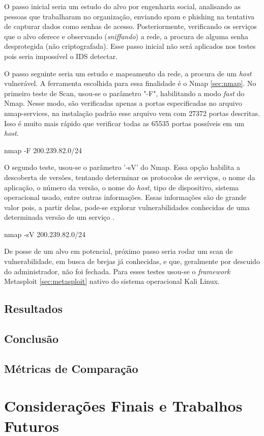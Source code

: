 \documentclass[
	12pt,				
	openright,		
	twoside,	
	a4paper,
	english,	
	brazil	
	]{abntex2}
\begin{document}
O passo inicial seria um estudo do alvo por engenharia social, analisando as pessoas que trabalharam no organização, enviando spam e phishing na tentativa de capturar dados como senhas de acesso. Posteriormente, verificando os serviços que o alvo oferece e observando (\textit{sniffando}) a rede, a procura de alguma senha desprotegida (não criptografada). Esse passo inicial não será aplicados nos testes pois seria impossível o IDS detectar.

O passo seguinte seria um estudo e mapeamento da rede, a procura de um \textit{host} vulnerável. A ferramenta escolhida para essa finalidade é o Nmap \ref{sec:nmap}. No primeiro teste de Scan, usou-se o parâmetro "-F", habilitando a modo \textit{fast} do Nmap. Nesse modo, são verificadas apenas a portas especificadas no arquivo nmap-services, na instalação padrão esse arquivo vem com 27372 portas descritas. Isso é muito mais rápido que verificar todas as 65535 portas possíveis em um \textit{host}.

nmap -F 200.239.82.0/24

O segundo teste, usou-se o parâmetro '-sV' do Nmap. Essa opção habilita a descoberta de versões, tentando determinar os protocolos de serviços, o nome da aplicação, o número da versão, o nome do \textit{host}, tipo de dispositivo, sistema operacional usado, entre outras informações. Essas informações são de grande valor pois, a partir delas, pode-se explorar vulnerabilidades conhecidas de uma determinada versão de um serviço \cite{nmap}.

nmap -sV 200.239.82.0/24

De posse de um alvo em potencial, próximo passo seria rodar um scan de vulnerabilidade, em busca de brejas já conhecidas, e que, geralmente por descuido do administrador, não foi fechada. Para esses testes usou-se o \textit{framework} Metasploit \ref{sec:metasploit} nativo do sistema operacional Kali Linux.

\section{Resultados} \label{sec:resultados}
\section{Conclusão} \label{sec:conclusão}
\section{Métricas de Comparação}
\chapter{Considerações Finais e Trabalhos Futuros} \label{considerações}
\postextual

\printindex
\end{document}
